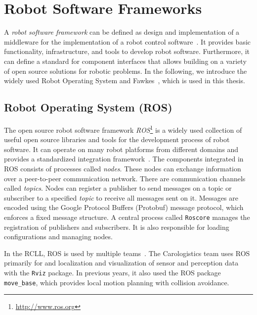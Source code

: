 \section{Robot Software Frameworks}
\label{sec:robot-software-frameworks}
A \emph{robot software framework} can be defined as design and
implementation of a middleware for the implementation of a robot
control software~\cite{tnthesis,orocos}. It provides basic functionality,
infrastructure, and tools to develop robot software. Furthermore, it
can define a standard for component interfaces that allows building on
a variety of open source solutions for robotic problems. In the
following, we introduce the widely used Robot Operating System and
Fawkes~\cite{Gazsim-Thesis}, which is used in this thesis.
\subsection{Robot Operating System (ROS)}
\label{sec:ros}
The open source robot software framework
\emph{ROS}\footnote{\url{http://www.ros.org}} is a widely used
collection of useful open source libraries and tools for the
development process of robot software. It can operate on many robot
platforms from different domains and provides a standardized
integration framework~\cite{Ros,ros-book}. The components integrated
in ROS consists of processes called \emph{nodes}. These nodes can
exchange information over a peer-to-peer communication network. There
are communication channels called \emph{topics}. Nodes can register a
publisher to send messages on a topic or subscriber to a specified
\emph{topic} to receive all messages sent on it. Messages are encoded
using the Google Protocol Buffers (Protobuf) message protocol, which
enforces a fixed message structure. A central process called
\texttt{Roscore} manages the registration of publishers and
subscribers. It is also responsible for loading configurations and
managing nodes.

In the RCLL, ROS is used by multiple teams~\cite{rc-2014}. The
Carologistics team uses ROS primarily for and localization and
visualization of sensor and perception data with the \texttt{Rviz}
package. In previous years, it also used the ROS package
\texttt{move\_base}, which provides local motion planning with
collision avoidance.

